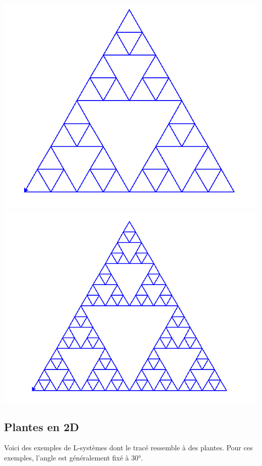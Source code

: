 \documentclass[11pt,class=report,crop=false]{standalone}
\begin{document}
\begin{exemple}
\begin{center}
\includegraphics[scale=\myscale,scale=0.22]{figures/ecran-lsysteme-7d}
\includegraphics[scale=\myscale,scale=0.22]{figures/ecran-lsysteme-7e}
\end{center}
\end{exemple}

\subsection{Plantes en 2D}

Voici des exemples de L-systèmes dont le tracé ressemble à des plantes.
Pour ces exemples, l'angle est généralement fixé à \ang{30}.
\end{document}
